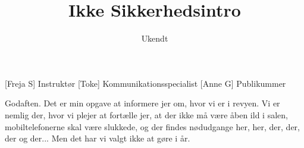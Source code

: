 \documentclass[a4paper,11pt]{article}
\title{Ikke Sikkerhedsintro}
\author{Ukendt}
\begin{document}
\maketitle

\begin{roles}
[Freja S] Instruktør
[Toke] Kommunikationsspecialist
[Anne G] Publikummer
\end{roles}


\begin{sketch}

 Godaften. Det er min opgave at informere jer om, hvor vi er i revyen. Vi er nemlig der, hvor vi plejer at fortælle jer, at der ikke må være åben ild i salen, mobiltelefonerne skal være slukkede, og der findes nødudgange her, her, der, der, der og der... Men det har vi valgt ikke at gøre i år.

\end{sketch}
\end{document}
